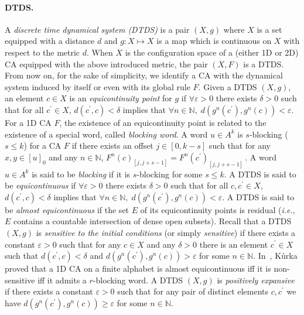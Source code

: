 \documentclass{llncs}
\makeatletter
\newcommand{\n}{\ensuremath{\mathbb{N}}\xspace}
\newcommand{\ie}{\emph{i.e.}\@\xspace}
\newcommand{\para}[1]{(#1)}
\newcommand{\ignore}[1]{}
\makeatother
\begin{document}
\paragraph{{\bf DTDS.}} A \emph{discrete time dynamical system (DTDS)}
is a pair $\para{X,g}$ where $X$ is a set equipped with a distance
$d$ and $g:X\mapsto X$ is a map which is continuous on $X$ with
respect to the metric $d$. When $X$ is the configuration space of
a (either 1D or 2D) CA equipped with the above introduced metric,
the pair $\para{X,F}$ is a DTDS. From now on, for the sake of
simplicity, we identify a CA with the dynamical system induced by
itself or even with its global rule $F$.
Given a DTDS $\para{X,g}$, an element $c\in X$ is
 an \emph{equicontinuity point} for $g$ if $\forall\varepsilon>0$
there exists $\delta>0$ such that for all $c^\prime\in X$,
$d(c^\prime,c)<\delta$ implies that $\forall
n\in\n,\;d(g^n(c^\prime),g^n(c))<\varepsilon$. For a 1D CA $F$,
the existence of an equicontinuity point is related to the
existence of a special word, called \emph{blocking word}. A word
$u\in A^k$ is $s$-blocking ($s\leq k$) for a CA $F$ if there
exists an offset $j\in [0, k-s]$ such that for any $x,y\in [u]_0$
and any $n\in\n$, $F^n(c)_{[j,j+s-1]}=F^n(c^\prime)_{[j,j+s-1]}$\,. A
word $u\in A^k$ is said to be \emph{blocking} if it is
$s$-blocking for some $s\leq k$. 
A DTDS is said to be
\emph{equicontinuous} if $\forall\varepsilon>0$ there exists
$\delta>0$ such that for all $c,c^\prime\in X$,
$d(c^\prime,c)<\delta$ implies that $\forall
n\in\n,\;d(g^n(c^\prime),g^n(c))<\varepsilon$. \ignore{If $X$ is a compact
set, a DTDS $\para{X,g}$ is equicontinuous iff the set $E$ of all
its equicontinuity points is the whole $X$.} A DTDS is said to be
\emph{almost equicontinuous} if the set $E$ of its equicontinuity points is residual (\ie, $E$ contains a countable intersection of dense open subsets).
Recall that a DTDS $\para{X,g}$ is \emph{sensitive to the initial
conditions} (or simply \emph{sensitive}) if there exists a
constant $\varepsilon>0$ such that for any $c\in X$ and any
$\delta>0$ there is an element $c^\prime\in X$ such that
$d(c^\prime,c)<\delta$ and $d(g^n(c^\prime),g^n(c))>\varepsilon$
for some $n\in\n$. In~\cite{kurka97}, K\r{u}rka proved that a 1D CA on a finite alphabet is almost equicontinuous iff it is non-sensitive iff it admits a $r$-blocking word.
A DTDS $\para{X,g}$ is \emph{positively
expansive} if there exists a constant $\varepsilon>0$ such that
for any pair of distinct elements $c,c^\prime$ we have
$d(g^n(c^\prime),g^n(c))\geq\varepsilon$ for some $n\in\n$.
\end{document}
